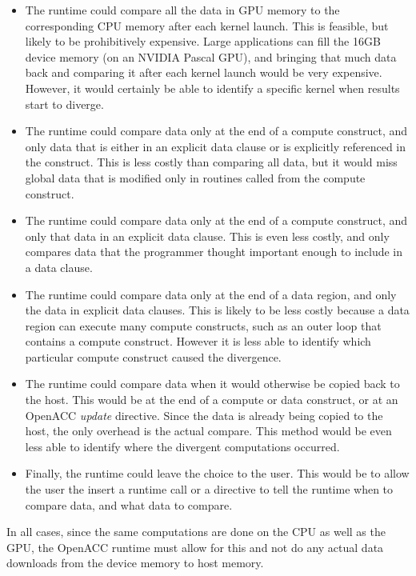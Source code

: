 \begin{itemize}
\item The runtime could compare all the data in GPU memory to the corresponding CPU memory after each kernel launch.
This is feasible, but likely to be prohibitively expensive.
Large applications can fill the 16GB device memory (on an NVIDIA Pascal GPU), and bringing that much data back and comparing it after each kernel launch would be very expensive.
However, it would certainly be able to identify a specific kernel when results start to diverge.

\item The runtime could compare data only at the end of a compute construct, and only data that is either in an explicit data clause or is explicitly referenced in the construct.
This is less costly than comparing all data, but it would miss global data that is modified only in routines called from the compute construct.

\item The runtime could compare data only at the end of a compute construct, and only that data in an explicit data clause.
This is even less costly, and only compares data that the programmer thought important enough to include in a data clause.

\item The runtime could compare data only at the end of a data region, and only the data in explicit data clauses.
This is likely to be less costly because a data region can execute many compute constructs, such as an outer loop that contains a compute construct.
However it is less able to identify which particular compute construct caused the divergence.

\item The runtime could compare data when it would otherwise be copied back to the host.
This would be at the end of a compute or data construct, or at an OpenACC \emph{update} directive.
Since the data is already being copied to the host, the only overhead is the actual compare.
This method would be even less able to identify where the divergent computations occurred.

\item Finally, the runtime could leave the choice to the user.
This would be to allow the user the insert a runtime call or a directive to tell the runtime when to compare data, and what data to compare.
\end{itemize}

In all cases, since the same computations are done on the CPU as well as the GPU, the OpenACC runtime must allow for this and not do any actual data downloads from the device memory to host memory.

